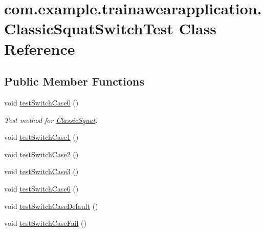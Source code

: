 \hypertarget{classcom_1_1example_1_1trainawearapplication_1_1_classic_squat_switch_test}{}\section{com.\+example.\+trainawearapplication.\+Classic\+Squat\+Switch\+Test Class Reference}
\label{classcom_1_1example_1_1trainawearapplication_1_1_classic_squat_switch_test}
\subsection*{Public Member Functions}
\begin{DoxyCompactItemize}
\item 
void \mbox{\hyperlink{classcom_1_1example_1_1trainawearapplication_1_1_classic_squat_switch_test_adca8046d4e95d7ca68bbc42ad0cf5d49}{test\+Switch\+Case0}} ()
\begin{DoxyCompactList}\small\item\em Test method for \mbox{\hyperlink{classcom_1_1example_1_1trainawearapplication_1_1_classic_squat}{Classic\+Squat}}. \end{DoxyCompactList}\item 
void \mbox{\hyperlink{classcom_1_1example_1_1trainawearapplication_1_1_classic_squat_switch_test_a8921734ff16a8ee1db468bbe571aaeef}{test\+Switch\+Case1}} ()
\item 
void \mbox{\hyperlink{classcom_1_1example_1_1trainawearapplication_1_1_classic_squat_switch_test_a14b7eb13809009e9175946b1bdcf3d46}{test\+Switch\+Case2}} ()
\item 
void \mbox{\hyperlink{classcom_1_1example_1_1trainawearapplication_1_1_classic_squat_switch_test_a2823f330df1b584569d8ab4b90e9634e}{test\+Switch\+Case3}} ()
\item 
void \mbox{\hyperlink{classcom_1_1example_1_1trainawearapplication_1_1_classic_squat_switch_test_a674df333a8d1b14d893d921e1e3be281}{test\+Switch\+Case6}} ()
\item 
void \mbox{\hyperlink{classcom_1_1example_1_1trainawearapplication_1_1_classic_squat_switch_test_af3378ca920eb59a2c102f85e3627084c}{test\+Switch\+Case\+Default}} ()
\item 
void \mbox{\hyperlink{classcom_1_1example_1_1trainawearapplication_1_1_classic_squat_switch_test_aade7e343e9d5050a6ce3142f756650e9}{test\+Switch\+Case\+Fail}} ()
\end{DoxyCompactItemize}

